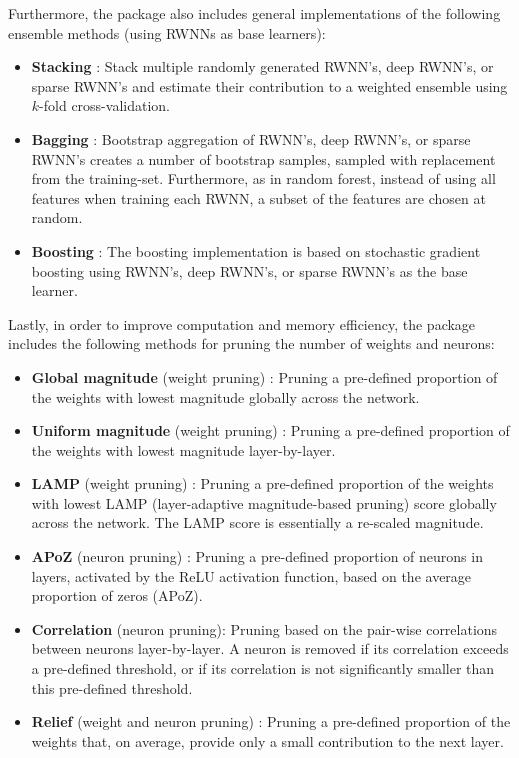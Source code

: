 \documentclass[
]{jss}
\providecommand{\tightlist}{%
  \setlength{\itemsep}{0pt}\setlength{\parskip}{0pt}}
\begin{document}
Furthermore, the  package also includes general
implementations of the following ensemble methods (using RWNNs as base
learners):

\begin{itemize}
\tightlist
\item
  \textbf{Stacking} \citep[\citet{Breiman1996a}]{Wolpert1992}: Stack
  multiple randomly generated RWNN's, deep RWNN's, or sparse RWNN's and
  estimate their contribution to a weighted ensemble using \(k\)-fold
  cross-validation.
\item
  \textbf{Bagging} \citep[\citet{Breiman2001},
  \citet{Xin2021}]{Breiman1996b}: Bootstrap aggregation of RWNN's, deep
  RWNN's, or sparse RWNN's creates a number of bootstrap samples,
  sampled with replacement from the training-set. Furthermore, as in
  random forest, instead of using all features when training each RWNN,
  a subset of the features are chosen at random.
\item
  \textbf{Boosting} \citep{Friedman2001}: The boosting implementation is
  based on stochastic gradient boosting using RWNN's, deep RWNN's, or
  sparse RWNN's as the base learner.
\end{itemize}

Lastly, in order to improve computation and memory efficiency, the
 package includes the following methods for pruning the number
of weights and neurons:

\begin{itemize}
\tightlist
\item
  \textbf{Global magnitude} (weight pruning)
  \citep[\citet{morcos2019}]{han2016}: Pruning a pre-defined proportion
  of the weights with lowest magnitude globally across the network.
\item
  \textbf{Uniform magnitude} (weight pruning)
  \citep[\citet{morcos2019}]{han2016}: Pruning a pre-defined proportion
  of the weights with lowest magnitude layer-by-layer.
\item
  \textbf{LAMP} (weight pruning) \citep{Lee2021}: Pruning a pre-defined
  proportion of the weights with lowest LAMP (layer-adaptive
  magnitude-based pruning) score globally across the network. The LAMP
  score is essentially a re-scaled magnitude.
\item
  \textbf{APoZ} (neuron pruning) \citep{hu2016}: Pruning a pre-defined
  proportion of neurons in layers, activated by the ReLU activation
  function, based on the average proportion of zeros (APoZ).
\item
  \textbf{Correlation} (neuron pruning): Pruning based on the pair-wise
  correlations between neurons layer-by-layer. A neuron is removed if
  its correlation exceeds a pre-defined threshold, or if its correlation
  is not significantly smaller than this pre-defined threshold.
\item
  \textbf{Relief} (weight and neuron pruning) \citep{Dekhovich2024}:
  Pruning a pre-defined proportion of the weights that, on average,
  provide only a small contribution to the next layer.
\end{itemize}
\end{document}
